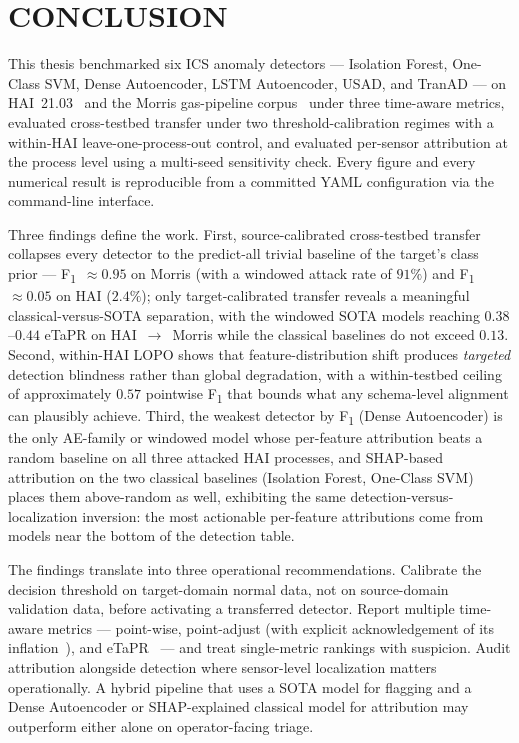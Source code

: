 \chapter*{CONCLUSION}
\label{ch:conclusion}

This thesis benchmarked six ICS anomaly detectors --- Isolation Forest, One-Class SVM, Dense Autoencoder, LSTM Autoencoder, USAD, and TranAD --- on HAI~21.03~\cite{shin2020hai} and the Morris gas-pipeline corpus~\cite{morris2014industrial} under three time-aware metrics, evaluated cross-testbed transfer under two threshold-calibration regimes with a within-HAI leave-one-process-out control, and evaluated per-sensor attribution at the process level using a multi-seed sensitivity check.  Every figure and every numerical result is reproducible from a committed YAML configuration via the  command-line interface.

Three findings define the work.  First, source-calibrated cross-testbed transfer collapses every detector to the predict-all trivial baseline of the target's class prior --- F\textsubscript{1}~$\approx 0.95$ on Morris (with a windowed attack rate of $91\%$) and F\textsubscript{1}~$\approx 0.05$ on HAI ($2.4\%$); only target-calibrated transfer reveals a meaningful classical-versus-SOTA separation, with the windowed SOTA models reaching $0.38$--$0.44$ eTaPR on HAI~$\rightarrow$~Morris while the classical baselines do not exceed $0.13$.  Second, within-HAI LOPO shows that feature-distribution shift produces \emph{targeted} detection blindness rather than global degradation, with a within-testbed ceiling of approximately $0.57$ pointwise F\textsubscript{1} that bounds what any schema-level alignment can plausibly achieve.  Third, the weakest detector by F\textsubscript{1} (Dense Autoencoder) is the only AE-family or windowed model whose per-feature attribution beats a random baseline on all three attacked HAI processes, and SHAP-based attribution on the two classical baselines (Isolation Forest, One-Class SVM) places them above-random as well, exhibiting the same detection-versus-localization inversion: the most actionable per-feature attributions come from models near the bottom of the detection table.

The findings translate into three operational recommendations.  Calibrate the decision threshold on target-domain normal data, not on source-domain validation data, before activating a transferred detector.  Report multiple time-aware metrics --- point-wise, point-adjust (with explicit acknowledgement of its inflation~\cite{kim2022towards}), and eTaPR~\cite{hwang2022etapr} --- and treat single-metric rankings with suspicion.  Audit attribution alongside detection where sensor-level localization matters operationally.  A hybrid pipeline that uses a SOTA model for flagging and a Dense Autoencoder or SHAP-explained classical model for attribution may outperform either alone on operator-facing triage.

